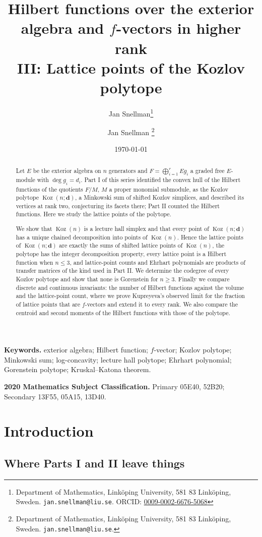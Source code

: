 \documentclass[11pt, a4paper, abstract=yes]{scrartcl}
\author{Jan Snellman\thanks{Department of Mathematics, Linköping University, 581 83 Linköping, Sweden. \texttt{jan.snellman@liu.se}. ORCID: \href{https://orcid.org/0009-0002-6676-5068}{0009-0002-6676-5068}}}
\author{Jan Snellman \orcidlink{0009-0002-6676-5068}\thanks{Department of Mathematics, Linköping University, 581 83 Linköping, Sweden. \texttt{jan.snellman@liu.se}.}}
\date{\today}
\title{Hilbert functions over the exterior algebra and \(f\)-vectors in higher rank\\\medskip
\large III: Lattice points of the Kozlov polytope}
\theoremstyle{definition}
\theoremstyle{remark}
\theoremstyle{plain}
\newcommand{\vek}[1]{\boldsymbol{#1}}
\theoremstyle{remark}
\theoremstyle{plain}
\newcommand{\Koz}{\operatorname{Koz}}
\begin{document}
\maketitle
\begin{abstract}
Let \(E\) be the exterior algebra on \(n\) generators and \(F=\bigoplus_{i=1}^rEg_i\) a graded free
\(E\)-module with \(\deg g_i=d_i\). Part I of this series identified the convex hull of the Hilbert
functions of the quotients \(F/M\), \(M\) a proper monomial submodule, as the Kozlov polytope
\(\Koz(n;\vek d)\), a Minkowski sum of shifted Kozlov simplices, and described its vertices at
rank two, conjecturing its facets there; Part II counted the Hilbert functions. Here we study the
lattice points of the polytope.

We show that
\(\Koz(n)\) is a lecture hall simplex and that every point of \(\Koz(n;\vek d)\) has a unique
chained decomposition into points of \(\Koz(n)\). Hence the lattice points of \(\Koz(n;\vek d)\) are
exactly the sums of shifted lattice points of \(\Koz(n)\), the polytope has the integer
decomposition property, every lattice point is a Hilbert function when \(n\le3\), and lattice-point
counts and Ehrhart polynomials are products of transfer matrices of the kind used in Part II. We
determine the codegree of every Kozlov polytope and show that none is Gorenstein for \(n\ge3\).
Finally we compare discrete and continuous invariants: the number of Hilbert functions against the
volume and the lattice-point count, where we prove Kupreyeva's observed limit for the fraction of
lattice points that are \(f\)-vectors and extend it to every rank. We also compare the centroid and
second moments of the Hilbert functions with those of the polytope.
\end{abstract}

\medskip\noindent\textbf{Keywords.} exterior algebra; Hilbert function; \(f\)-vector; Kozlov
polytope; Minkowski sum; log-concavity; lecture hall
polytope; Ehrhart polynomial; Gorenstein polytope; Kruskal--Katona theorem.

\smallskip\noindent\textbf{2020 Mathematics Subject Classification.} Primary 05E40, 52B20;
Secondary 13F55, 05A15, 13D40.
\medskip

\setcounter{tocdepth}{2}
\tableofcontents
\section{Introduction}
\label{sec-intro}
\subsection{Where Parts I and II leave things}
\label{sec:org8fc39a7}
\end{document}
